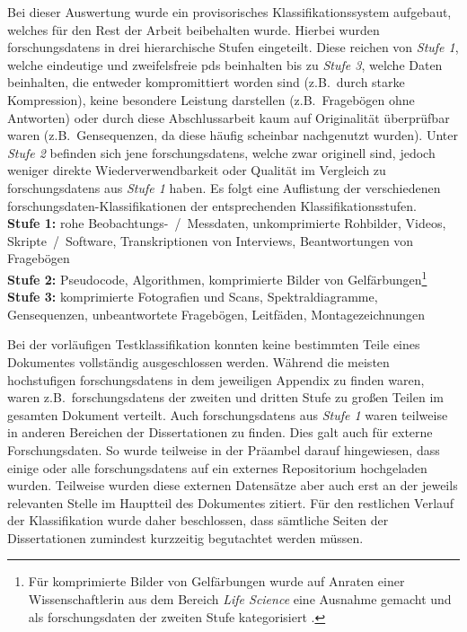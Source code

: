 Bei dieser Auswertung wurde ein provisorisches Klassifikationssystem aufgebaut, welches für den Rest der Arbeit beibehalten wurde.
Hierbei wurden \glspl{forschungsdaten} in drei hierarchische Stufen eingeteilt.
Diese reichen von \textit{Stufe 1}, welche eindeutige und zweifelsfreie \glspl{pd} beinhalten bis zu \textit{Stufe 3}, welche Daten beinhalten, die entweder kompromittiert worden sind (z.B.~durch starke Kompression), keine besondere Leistung darstellen (z.B.~Fragebögen ohne Antworten) oder durch diese Abschlussarbeit kaum auf Originalität überprüfbar waren (z.B.~Gensequenzen, da diese häufig scheinbar nachgenutzt wurden).
Unter \textit{Stufe 2} befinden sich jene \glspl{forschungsdaten}, welche zwar originell sind, jedoch weniger direkte Wiederverwendbarkeit oder Qualität im Vergleich zu \glspl{forschungsdaten} aus \textit{Stufe 1} haben.
Es folgt eine Auflistung der verschiedenen \gls{forschungsdaten}-Klassifikationen der entsprechenden Klassifikationsstufen.\\
\textbf{Stufe 1:} rohe Beobachtungs-~/~Messdaten, unkomprimierte Rohbilder, Videos, Skripte~/~Software, Transkriptionen von Interviews, Beantwortungen von Fragebögen\\
\textbf{Stufe 2:} Pseudocode, Algorithmen, komprimierte Bilder von Gelfärbungen\footnote{Für komprimierte Bilder von Gelfärbungen wurde auf Anraten einer Wissenschaftlerin aus dem Bereich \textit{Life Science} eine Ausnahme gemacht und als \gls{forschungsdaten} der zweiten Stufe kategorisiert \autocite{SarahPC}.}\\
\textbf{Stufe 3:} komprimierte Fotografien und Scans, Spektraldiagramme, Gensequenzen, unbeantwortete Fragebögen, Leitfäden, Montagezeichnungen

Bei der vorläufigen Testklassifikation konnten keine bestimmten Teile eines Dokumentes vollständig ausgeschlossen werden.
Während die meisten hochstufigen \glspl{forschungsdaten} in dem jeweiligen Appendix zu finden waren, waren z.B.~\glspl{forschungsdaten} der zweiten und dritten Stufe zu großen Teilen im gesamten Dokument verteilt.
Auch \glspl{forschungsdaten} aus \textit{Stufe 1} waren teilweise in anderen Bereichen der Dissertationen zu finden.
Dies galt auch für externe Forschungsdaten.
So wurde teilweise in der Präambel darauf hingewiesen, dass einige oder alle \glspl{forschungsdaten} auf ein externes Repositorium hochgeladen wurden.
Teilweise wurden diese externen Datensätze aber auch erst an der jeweils relevanten Stelle im Hauptteil des Dokumentes zitiert.
Für den restlichen Verlauf der Klassifikation wurde daher beschlossen, dass sämtliche Seiten der Dissertationen zumindest kurzzeitig begutachtet werden müssen.

